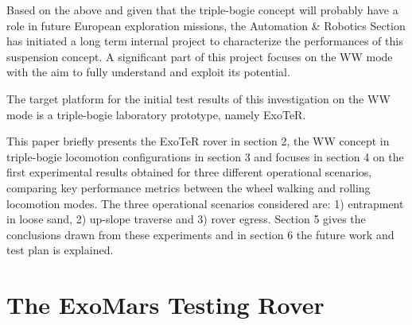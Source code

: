\documentclass[a4paper,twocolumn]{esapub2005} %
\begin{document}
Based on the above and given that the triple-bogie concept will probably have a role in future European exploration missions, the Automation \& Robotics Section has initiated a long term internal project to characterize the performances of this suspension concept. A significant part of this project focuses on the WW mode with the aim to fully understand and exploit its potential.

The target platform for the initial test results of this investigation on the WW mode is a triple-bogie laboratory prototype, namely ExoTeR. 

%

This paper briefly presents the ExoTeR rover in section 2, the WW
concept in triple-bogie locomotion configurations in section 3 and focuses in
section 4 on the first experimental results obtained for three different
operational scenarios, comparing key performance metrics between the wheel
walking and rolling locomotion modes. The three operational scenarios
considered are: 1) entrapment in loose sand, 2) up-slope traverse and 3) rover
egress. Section 5 gives the conclusions drawn from these experiments and in
section 6 the future work and test plan is explained.

\section{The ExoMars Testing Rover}
\end{document}
